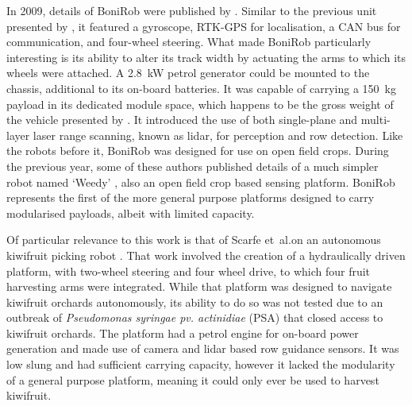\documentclass[preprint,authoryear,12pt]{elsarticle}
\begin{document}
        In 2009, details of BoniRob were published by \cite{Ruckelshausen2009}.
        Similar to the previous unit presented by \cite{Bak2004}, it featured a gyroscope, RTK-GPS for localisation, a CAN bus for communication, and four-wheel steering.
        What made BoniRob particularly interesting is its ability to alter its track width by actuating the arms to which its wheels were attached.
        A \SI{2.8}{\kilo\watt} petrol generator could be mounted to the chassis, additional to its on-board batteries.
        It was capable of carrying a \SI{150}{\kilo\gram} payload in its dedicated module space, which happens to be the gross weight of the vehicle presented by \cite{Bak2004}.
        It introduced the use of both single-plane and multi-layer laser range scanning, known as lidar, for perception and row detection.
        Like the robots before it, BoniRob was designed for use on open field crops.
        During the previous year, some of these authors published details of a much simpler robot named `Weedy' \citep{Klose2008}, also an open field crop based sensing platform.
        BoniRob represents the first of the more general purpose platforms designed to carry modularised payloads, albeit with limited capacity.

        Of particular relevance to this work is that of Scarfe et~al.\@ on an autonomous kiwifruit picking robot \citep{scarfe2009, Scarfe2012}.
        That work involved the creation of a hydraulically driven platform, with two-wheel steering and four wheel drive, to which four fruit harvesting arms were integrated.
        While that platform was designed to navigate kiwifruit orchards autonomously, its ability to do so was not tested due to an outbreak of \textit{Pseudomonas syringae pv. actinidiae} (PSA) that closed access to kiwifruit orchards.
        The platform had a petrol engine for on-board power generation and made use of camera and lidar based row guidance sensors.
        It was low slung and had sufficient carrying capacity, however it lacked the modularity of a general purpose platform, meaning it could only ever be used to harvest kiwifruit.
\end{document}
